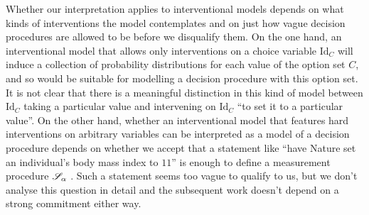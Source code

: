 Whether our interpretation applies to interventional models depends on what kinds of interventions the model contemplates and on just how vague decision procedures are allowed to be before we disqualify them. On the one hand, an interventional model that allows only interventions on a choice variable $\mathrm{Id}_C$ will induce a collection of probability distributions for each value of the option set $C$, and so would be suitable for modelling a decision procedure with this option set. It is not clear that there is a meaningful distinction in this kind of model between $\mathrm{Id}_C$ taking a particular value and intervening on $\mathrm{Id}_C$ ``to set it to a particular value''. On the other hand, whether an interventional model that features hard interventions on arbitrary variables can be interpreted as a model of a decision procedure depends on whether we accept that a statement like ``have Nature set an individual's body mass index to $11$'' is enough to define a measurement procedure $\mathscr{S}_\alpha$ \citep{pearl_does_2018}. Such a statement seems too vague to qualify to us, but we don't analyse this question in detail and the subsequent work doesn't depend on a strong commitment either way.